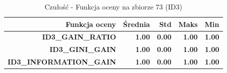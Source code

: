 \begin{table}[htbp]
\centering
\small
\setlength{\tabcolsep}{6pt}
\renewcommand{\arraystretch}{1.2}
\caption{Czułość - Funkcja oceny na zbiorze 73 (ID3)}
\label{tab:ID3_eval_function_73_recall}
\begin{tabular}{r|r|r|r|r}
\toprule
Funkcja oceny & Średnia & Std & Maks & Min \\
\hline
\textbf{ID3\_GAIN\_RATIO} & \textbf{1.00} & \textbf{0.00} & \textbf{1.00} & \textbf{1.00} \\
\textbf{ID3\_GINI\_GAIN} & \textbf{1.00} & \textbf{0.00} & \textbf{1.00} & \textbf{1.00} \\
\textbf{ID3\_INFORMATION\_GAIN} & \textbf{1.00} & \textbf{0.00} & \textbf{1.00} & \textbf{1.00} \\
\bottomrule
\end{tabular}
\end{table}
